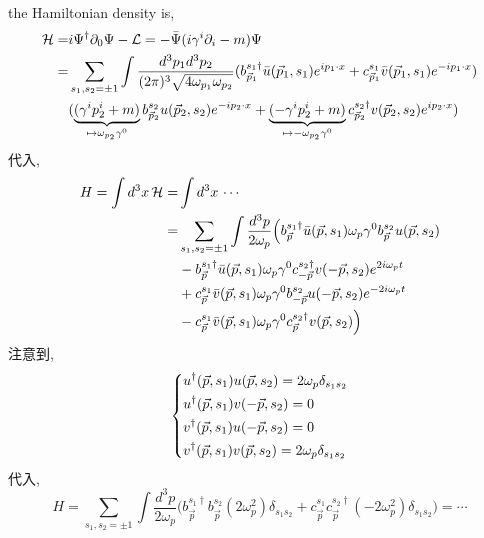 \begin{itemize}
	\begin{tcolorbox}[title=calculation:]
		the Hamiltonian density is,
		\begin{align}
			\mathcal{H} =& i \Psi^\dag \partial_0 \Psi - \mathcal{L} = - \bar{\Psi} (i \gamma^i \partial_i - m) \Psi \notag \\
			=& \sum_{s_1, s_2 = \pm 1} \int \frac{d^3 p_1 d^3 p_2}{(2 \pi)^3 \sqrt{4 \omega_{p_1} \omega_{p_2}}} (b^{s_1 \dag}_{\vec{p}_1} \bar{u}(\vec{p}_1, s_1) e^{i p_1 \cdot x} + c^{s_1}_{\vec{p}_1} \bar{v}(\vec{p}_1, s_1) e^{- i p_1 \cdot x}) \notag \\
			& (\underbrace{(\gamma^i p_2^i + m)}_{\mapsto \omega_{p_2} \gamma^0} b^{s_2}_{\vec{p}_2} u(\vec{p}_2, s_2) e^{- i p_2 \cdot x} + \underbrace{(- \gamma^i p_2^i + m)}_{\mapsto - \omega_{p_2} \gamma^0} c^{s_2 \dag}_{\vec{p}_2} v(\vec{p}_2, s_2) e^{i p_2 \cdot x})
		\end{align}
		代入,
		\begin{align}
			H = \int d^3 x \, \mathcal{H} =& \int d^3 x \, \cdots \notag \\
			=& \sum_{s_1, s_2 = \pm 1} \int \frac{d^3 p}{2 \omega_p} \Big( b^{s_1 \dag}_{\vec{p}} \bar{u}(\vec{p}, s_1) \omega_p \gamma^0 b^{s_2}_{\vec{p}} u(\vec{p}, s_2) \notag \\
			& - b^{s_1 \dag}_{\vec{p}} \bar{u}(\vec{p}, s_1) \omega_p \gamma^0 c^{s_2 \dag}_{- \vec{p}} v(- \vec{p}, s_2) e^{2 i \omega_p t} \notag \\
			& + c^{s_1}_{\vec{p}} \bar{v}(\vec{p}, s_1) \omega_p \gamma^0 b^{s_2}_{- \vec{p}} u(- \vec{p}, s_2) e^{- 2 i \omega_p t} \notag \\
			& - c^{s_1}_{\vec{p}} \bar{v}(\vec{p}, s_1) \omega_p \gamma^0 c^{s_2 \dag}_{\vec{p}} v(\vec{p}, s_2) \Big)
		\end{align}
		注意到,
		\begin{equation}
			\begin{dcases}
				u^\dag(\vec{p}, s_1) u(\vec{p}, s_2) = 2 \omega_p \delta_{s_1 s_2} \\
				u^\dag(\vec{p}, s_1) v(- \vec{p}, s_2) = 0 \\
				v^\dag(\vec{p}, s_1) u(- \vec{p}, s_2) = 0 \\
				v^\dag(\vec{p}, s_1) v(\vec{p}, s_2) = 2 \omega_p \delta_{s_1 s_2}
			\end{dcases}
		\end{equation}
		代入,
		\begin{equation}
			H = \sum_{s_1, s_2 = \pm 1} \int \frac{d^3 p}{2 \omega_p} \Big( b^{s_1 \dag}_{\vec{p}} b^{s_2}_{\vec{p}} (2 \omega_p^2) \delta_{s_1 s_2} + c^{s_1}_{\vec{p}} c^{s_2 \dag}_{\vec{p}} (- 2 \omega_p^2) \delta_{s_1 s_2} \Big) = \cdots
		\end{equation}
	\end{tcolorbox}
\end{itemize}

